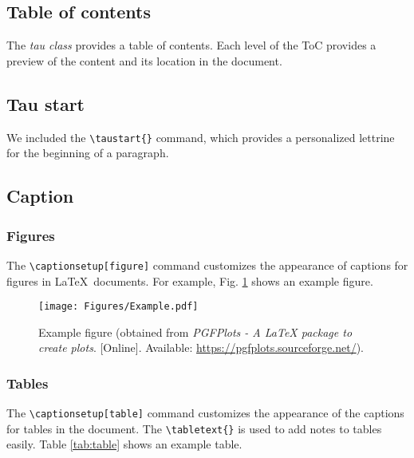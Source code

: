 \documentclass[9pt,a4paper,twoside]{tau}
\begin{document}
    \subsection{Table of contents}

        The \textit{tau class} provides a table of contents. Each level of the ToC provides a preview of the content and its location in the document.

    \subsection{Tau start}

        We included the \verb*|\taustart{}| command, which provides a personalized lettrine for the beginning of a paragraph.
        
    \subsection{Caption}

        \subsubsection{Figures}

            The \verb*|\captionsetup[figure]| command customizes the appearance of captions for figures in \LaTeX\ documents. For example, Fig. \ref{fig:figure} shows an example figure.
			
            \begin{figure}[H]
                \centering
                \texttt{[image: Figures/Example.pdf]}
                \caption{Example figure (obtained from \textit{PGFPlots - A LaTeX package to create plots}. [Online]. Available: \url{https://pgfplots.sourceforge.net/}).}
                \label{fig:figure}
            \end{figure}

        \subsubsection{Tables}
    
            The \verb*|\captionsetup[table]| command customizes the appearance of the captions for tables in the document. The \verb*|\tabletext{}| is used to add notes to tables easily. Table \ref{tab:table} shows an example table.
            
\end{document}
